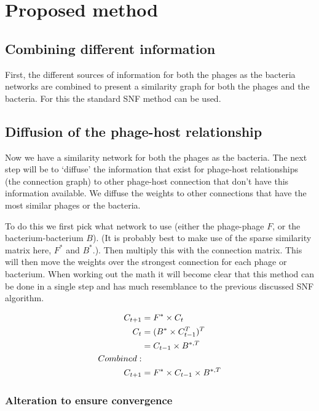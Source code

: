 \documentclass{article}
\begin{document}
\section{Proposed method}

\subsection{Combining different information}

First, the different sources of information for both the phages as the bacteria networks
are combined to present a similarity graph for both the phages and the bacteria.
For this the standard SNF method can be used.

\subsection{Diffusion of the phage-host relationship}

Now we have a similarity network for both the phages as the bacteria. 
The next step will be to `diffuse' the information that exist for phage-host 
relationships (the connection graph) 
to other phage-host connection that don't have this information
available.  
We diffuse the weights to other connections that have the most similar phages
or the bacteria.

To do this we first pick what network to use (either the phage-phage $F$, or 
the bacterium-bacterium $B$). (It is probably best to make use of the sparse
similarity matrix here, $F^*$ and $B^*$.).
Then multiply this with the connection matrix. This will then move the
weights over the strongest connection for each phage or bacterium.
When working out the math it will become clear that this method can be done in a single 
step and has much resemblance to the previous discussed SNF algorithm. 

\begin{align}
    \begin{split}
    C_{t+1} &= F^* \times C_t \\
    C_{t} &= (B^* \times C_{t - 1}^{T})^{T} \\
          &= C_{t - 1} \times B^{*,T} \\
    \hfil Combined: \\
    C_{t+1} &= F^* \times C_{t - 1} \times B^{*,T}
    \end{split}
\end{align}

\subsubsection{Alteration to ensure convergence}
\end{document}
